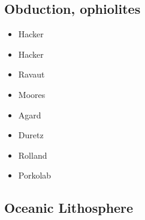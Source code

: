 \subsection{Obduction, ophiolites}
 

\begin{scriptsize}
\begin{itemize}
\item[\nineteenninety] Hacker \cite{hack90}
\item[\nineteenninetyone] Hacker \cite{hack91}
\item[\nineteenninetyseven] Ravaut \etal \cite{rabh97}
\item[\twothousand] Moores \etal \cite{mokd00}
\item[\twothousandfourteen] Agard \etal \cite{agzf14}
\item[\twothousandsixteen] Duretz \etal \cite{duay16}
\item[\twothousandtwenty] Rolland \etal \cite{rohb20}
\item[\twothousandtwentyone] Porkolab \etal \cite{pody21}
\end{itemize}
\end{scriptsize}

\subsection{Oceanic Lithosphere}

